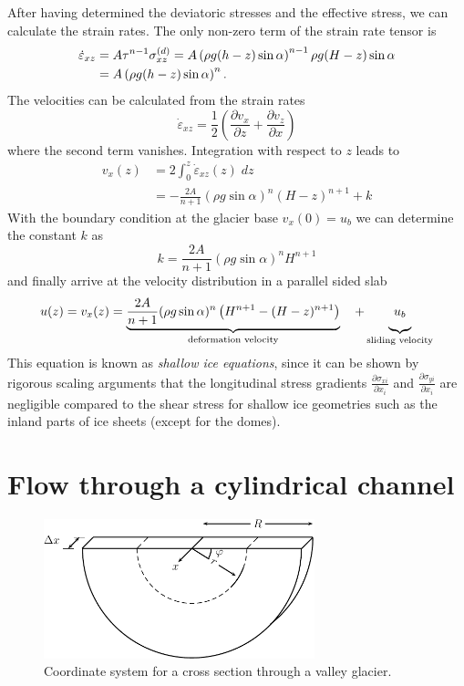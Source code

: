\documentclass[11pt,halfparskip]{scrartcl}
\newcommand{\epsdot}{\dot{\varepsilon}}
\begin{document}
After having determined the deviatoric stresses and the effective stress, we
can calculate the strain rates.  The only non-zero term of the strain rate
tensor is 
%
\begin{align}
  \epsdot_{xz} &= A \tau^{n-1}\sigma^{(d)}_{xz}
  = A \left( \rho g (h-z) \sin\alpha \right)^{n-1}\rho g (H-z) \sin\alpha
  \notag\\
  &= A\left( \rho g (h-z) \sin\alpha \right)^{n}.
\end{align}
\newpage
The velocities can be calculated from the strain rates
%
\begin{equation*}
  \epsdot_{xz} = \frac{1}{2}\left( \frac{\partial v_x}{\partial z} + \frac{\partial v_z}{\partial x} \right)
\end{equation*}
%
where the second term vanishes.  Integration with respect to $z$ leads to
%
\begin{align*}
  v_x(z) &= 2 \int_0^z \epsdot_{xz}(z)\; dz\\
         &= - \frac{2A}{n+1} (\rho g \sin\alpha)^n (H-z)^{n+1} + k
\end{align*}
%
With the boundary condition at the glacier base $v_x(0)=u_b$ we can determine
the constant $k$ as
%
\begin{equation*}
  k = \frac{2A}{n+1} (\rho g \sin\alpha)^n H^{n+1}
\end{equation*}
%
and finally arrive at the velocity distribution in a parallel sided slab
%
\begin{equation}
  \label{eq:parallel-slab-velocity}
 u(z) = v_x(z) = \underbrace{\frac{2A}{n+1} (\rho g \sin\alpha)^n \left( H^{n+1}-(H-z)^{n+1}
  \right)}_{\text{deformation velocity}}\quad + \underbrace{u_b\rule[-1.9ex]{0ex}{1ex}}_{\text{sliding velocity}}
\end{equation}
%
This equation is known as \emph{shallow ice equations}, since it
can be shown by rigorous scaling arguments that the longitudinal stress
gradients $\frac{\partial \sigma_{xi}}{\partial x_{i}}$ and $\frac{\partial
  \sigma_{yi}}{\partial x_i}$ are negligible compared to the shear stress for
shallow ice geometries such as the inland parts of ice sheets (except for the
domes).


\section{Flow through a cylindrical channel}
\label{sec:flow-through-cylindrical-channel}

\begin{figure}[bhtp]
  \centering
  \includegraphics[width=0.7\textwidth]{figures/fig_channel}
  \caption{Coordinate system for a cross section through a valley glacier.  }
  \label{fig:valley-glacier-coord}
\end{figure}
\end{document}

